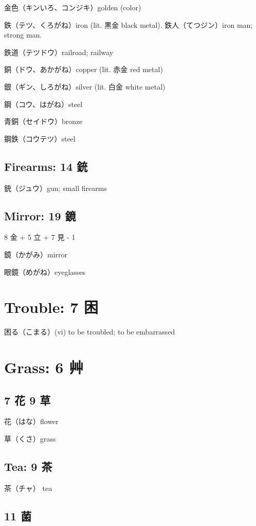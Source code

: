 金色（キンいろ、コンジキ）golden (color)

鉄（テツ、くろがね）iron (lit. 黒金 black metal).
鉄人（てつジン）iron man; strong man.

鉄道（テツドウ）railroad; railway

銅（ドウ、あかがね）copper (lit. 赤金 red metal)

銀（ギン、しろがね）silver (lit. 白金 white metal)

鋼（コウ、はがね）steel

青銅（セイドウ）bronze

鋼鉄（コウテツ）steel

\subsection{Firearms: 14 銃}

銃（ジュウ）gun; small firearms

\subsection{Mirror: 19 鏡}

8 金 + 5 立 + 7 見 - 1

鏡（かがみ）mirror

眼鏡（めがね）eyeglasses

\section{Trouble: 7 困}

困る（こまる）(vi) to be troubled; to be embarrassed

\section{Grass: 6 艸}

\subsection{7 花 9 草}

花（はな）flower

草（くさ）grass

\subsection{Tea: 9 茶}

茶（チャ） tea

\subsection{11 菌}

